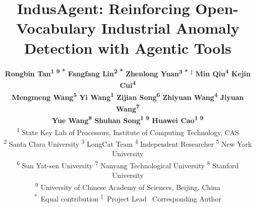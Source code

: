 \documentclass{article}
\title{IndusAgent: Reinforcing Open-Vocabulary Industrial Anomaly Detection with Agentic Tools}
\author{
\textbf{
Rongbin Tan\textsuperscript{1 9 *} \quad
Fangfang Lin\textsuperscript{2 *} \quad
Zhenlong Yuan\textsuperscript{3 * \ensuremath{\ddagger}} \quad
Min Qiu\textsuperscript{4} \quad
Kejin Cui\textsuperscript{4} \quad
}
\\[0.6em]
\textbf{
Mengmeng Wang\textsuperscript{5} \quad
Yi Wang\textsuperscript{1} \quad
Zijian Song\textsuperscript{6} \quad
Zhiyuan Wang\textsuperscript{4} \quad
Jiyuan Wang\textsuperscript{7} \quad
}
\\[0.6em]
\textbf{
Yue Wang\textsuperscript{8} \quad
Shuhan Song\textsuperscript{1 9 \textsection}
Huawei Cao\textsuperscript{1 9}
}
\\[1.0em]
\textsuperscript{1} State Key Lab of Processors, Institute of Computing Technology, CAS \quad
\\[0.6em]
\textsuperscript{2} Santa Clara University \quad
\textsuperscript{3} LongCat Team \quad
\textsuperscript{4} Independent Researcher \quad
\textsuperscript{5} New York University \quad
\\[0.6em]
\textsuperscript{6} Sun Yat-sen University \quad 
\textsuperscript{7} Nanyang Technological University \quad
\textsuperscript{8} Stanford University \quad
\\[0.6em]
\textsuperscript{9} University of Chinese Academy of Sciences, Beijing, China
\\[0.6em]
\footnotesize
\textsuperscript{*}~Equal contribution\quad
\textsuperscript{\ensuremath{\ddagger}}~Project Lead\quad
\textsuperscript{\textsection}~Corresponding Author
}
\begin{document}
\maketitle


\begin{abstract}



\end{abstract}
\end{document}
